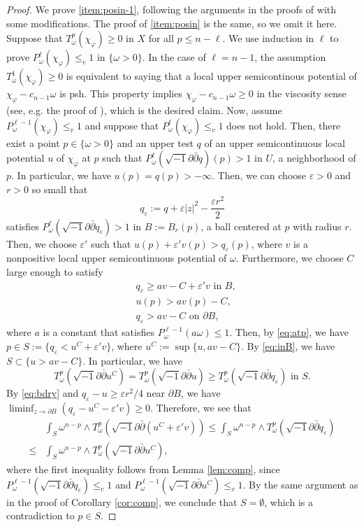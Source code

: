 \documentclass{amsart}
\numberwithin{equation}{section}
\theoremstyle{plain}
\theoremstyle{definition}
\theoremstyle{remark}
\newcommand{\delb}{\sqrt{-1}\partial\bar{\partial}}
\begin{document}
\begin{proof}
    We prove \ref{item:posin-1}, following the arguments in the proofs of \cite[Propositions 1.5 and 1.11]{EGZ} with some modifications. The proof of \ref{item:posin} is the same, so we omit it here. Suppose that $T^p_\omega(\chi_\varphi)\ge0$ in $X$ for all $p\le n-\ell$. 
    We use induction in $\ell$ to prove $P^\ell_\omega(\chi_\varphi)\le_v1$ in $\{\omega>0\}$. In the case of $\ell=n-1$, the assumption $T^1_\omega(\chi_\varphi)\ge0$ is equivalent to saying that a local upper semicontinous potential of $\chi_\varphi-c_{n-1}\omega$ is psh. This property implies $\chi_\varphi-c_{n-1}\omega\ge0$ in the viscosity sense (see, e.g. the proof of \cite[Proposition 1.3]{EGZ}), which is the desired claim.
    Now, assume $P^{\ell-1}_\omega(\chi_\varphi)\le_v1$ and suppose that $P^\ell_\omega(\chi_\varphi)\le_v1$ does not hold. Then, there exist a point $p\in\{\omega>0\}$ and an upper test $q$ of an upper semicontinuous local potential $u$ of $\chi_\varphi$ at $p$ such that $P^\ell_\omega(\delb q)(p)>1$ in $U$, a neighborhood of $p$. In particular, we have $u(p)=q(p)>-\infty$.
    Then, we can choose $\varepsilon>0$ and $r>0$ so small that 
    $$q_\varepsilon:=q+\varepsilon\vert z\vert^2-\frac{\varepsilon r^2}{2}$$
    satisfies $P^\ell_\omega(\delb q_\varepsilon)>1$ in $B:=B_{r}(p)$, a ball centered at $p$ with radius $r$. Then, we choose $\varepsilon'$ such that $u(p)+\varepsilon'v(p)>q_\varepsilon(p)$, where $v$ is a nonpositive local upper semicontinuous potential of $\omega$. 
    Furthermore, we choose $C$ large enough to satisfy
    \begin{align}
        &\label{eq:inB} q_\varepsilon\ge av-C+\varepsilon'v \text{ in } B,\\
        &\label{eq:atp} u(p)>av(p)-C,\\
        &\label{eq:bdry}q_\varepsilon> av-C \text{ on }\partial B,
    \end{align}
    where $a$ is a constant that satisfies $P^{\ell-1}_\omega(a\omega)\le1$.
    Then, by \eqref{eq:atp}, we have $p\in S:=\{q_\varepsilon<u^C+\varepsilon'v\}$, where $u^C:=\sup\{u,av-C\}$. By \eqref{eq:inB}, we have $S\subset\{u>av-C\}$. In particular, we have $$T^p_\omega(\delb u^C)=T^p_\omega(\delb u)\ge T^p_\omega(\delb q_\varepsilon) \text{ in } S.$$ By \eqref{eq:bdry} and $q_\varepsilon-u\ge \varepsilon r^2/4$ near $\partial B$, we have $\liminf_{z\to\partial B}(q_\varepsilon-u^C-\varepsilon'v)\ge0$. Therefore, we see that 
    \begin{equation*}
        \begin{aligned}
            &\int_S \omega^{n-p}\wedge T^p_\omega(\delb (u^C+\varepsilon' v))\le\int_S \omega^{n-p}\wedge T^p_\omega(\delb q_\varepsilon)\\
            \le&\int_{S}\omega^{n-p}\wedge T^p_\omega(\delb u^C),      
        \end{aligned}
    \end{equation*}
    where the first inequality follows from Lemma \ref{lem:comp}, since $P^{\ell-1}_\omega(\delb q_\varepsilon)\le_v1$ and $P^{\ell-1}_\omega(\delb u^C)\le_v1$. By the same argument as in the proof of Corollary \ref{cor:comp}, we conclude that $S=\emptyset$, which is a contradiction to $p\in S$. 
\end{proof}
\end{document}
